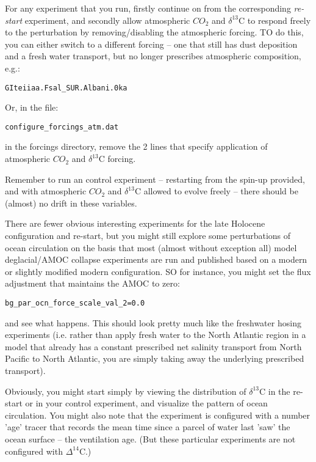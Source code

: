 \documentclass[11pt,fleqn]{book} %
\begin{document}
For any experiment that you run, firstly continue on from the corresponding \textit{re-start} experiment, and secondly allow atmospheric \(CO_{2}\) and $\delta^{13}$C to respond freely to the perturbation by removing/disabling the atmospheric forcing. TO do this, you can either switch to a different forcing -- one that still has dust deposition and a fresh water transport, but no longer prescribes atmospheric composition, e.g.:
\vspace{-2mm}\begin{verbatim}
GIteiiaa.Fsal_SUR.Albani.0ka
\end{verbatim}\vspace{-2mm}
Or, in the file:
\vspace{-2mm}\begin{verbatim}
configure_forcings_atm.dat
\end{verbatim}\vspace{-2mm} 
in the forcings directory, remove the 2 lines that specify application of atmospheric \(CO_{2}\) and $\delta^{13}$C forcing.

Remember to run an control experiment -- restarting from the spin-up provided, and with atmospheric \(CO_{2}\) and $\delta^{13}$C allowed to evolve freely -- there should be (almost) no drift in these variables.

There are fewer obvious interesting experiments for the late Holocene configuration and re-start, but you might still explore some perturbations of ocean circulation on the basis that most (almost without exception all) model deglacial/AMOC collapse experiments are run and published based on a modern or slightly modified modern configuration. SO for instance, you might set the flux adjustment that maintains the AMOC to zero:
\vspace{-2mm}\begin{verbatim}
bg_par_ocn_force_scale_val_2=0.0
\end{verbatim}\vspace{-2mm}
and see what happens. This should look pretty much like the freshwater hosing experiments (i.e. rather than apply fresh water to the North Atlantic region in a model that already has a constant prescribed net salinity transport from North Pacific to North Atlantic, you are simply taking away the underlying prescribed transport). 

Obviously, you might start simply by viewing the distribution of $\delta^{13}$C in the re-start or in your control experiment, and visualize the pattern of ocean circulation. You might also note that the experiment is configured with a number 'age' tracer that records the mean time since a parcel of water last 'saw' the ocean surface -- the ventilation age. (But these particular experiments are not configured with  $\Delta^{14}$C.)
\end{document}
